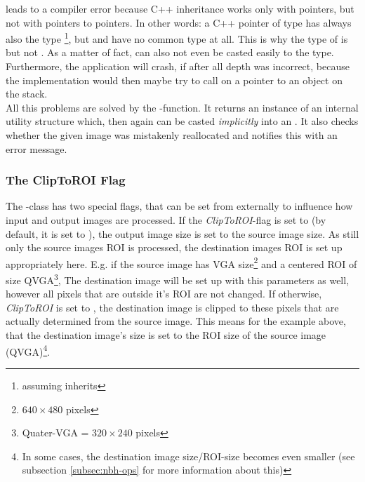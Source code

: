 
leads to a compiler error because C++ inheritance works only with pointers, but not with pointers to pointers. In other words: a C++ pointer of type  has always also the type \footnote{assuming  inherits }, but  and  have no common type at all. This is why the type of  is  but not . As a matter of fact,  can also not even be casted easily to the  type.
Furthermore, the application will crash, if after all depth was incorrect, because the implementation would then maybe try to call  on a pointer to an object on the stack.\\
All this problems are solved by the -function. It returns an instance of an internal utility structure which, then again can be casted \emph{implicitly} into an . It also checks whether the given image was mistakenly reallocated and notifies this with an error message.


\subsubsection{The ClipToROI Flag\label{subsec:clip-to-roi}}
The -class has two special flags, that can be set from externally to influence how input and output images are processed. If the \emph{ClipToROI}-flag is set to  (by default, it is set to ), the output image size is set to the source image size. As still only the source images ROI is processed, the destination images ROI is set up appropriately here. E.g. if the source image has VGA size\footnote{$640 \times{}480$ pixels} and a centered ROI of size QVGA\footnote{Quater-VGA = $320\times{}240$ pixels}, The destination image will be set up with this parameters as well, however all pixels that are outside it's ROI are not changed. If otherwise, \emph{ClipToROI} is set to , the destination image is clipped to these pixels that are actually determined from the source image. This means for the example above, that the destination image's size is set to the ROI size of the source image (QVGA)\footnote{In some cases, the destination image size/ROI-size becomes even smaller (see subsection \ref{subsec:nbh-ops} for more information about this)}.

